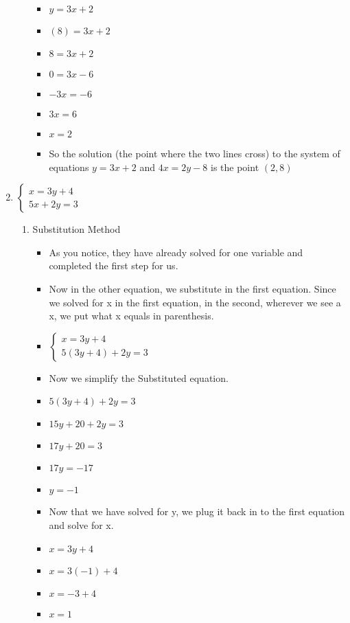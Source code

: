 \documentclass{article}
\begin{document}
\begin{enumerate}
\begin{enumerate}
\begin{itemize}
    \item []  $y=3x+2$
    \item []  $(8)=3x+2$
    \item []  $8=3x+2$
    \item []  $0=3x-6$
    \item []  $-3x=-6$
    \item []  $3x=6$
    \item []  $x=2$
    \item So the solution (the point where the two lines cross) to the system of equations $y=3x+2$ and $4x=2y-8$ is the point $(2,8)$
    \end{itemize}
  \end{enumerate}
\item $\left\{ \begin{array}{l}
      x=3y+4 \\
      5x+2y=3 \end{array} \right.$
  \begin{enumerate}
  \item Substitution Method
    \begin{itemize}
    \item As you notice, they have already solved for one variable and completed the first step for us.
    \item Now in the other equation, we substitute in the first equation. Since we solved for x in the first equation, in the second, wherever we see a x, we put what x equals in parenthesis.
    \item []  $\left\{ \begin{array}{l}
              x=3y+4 \\
              5(3y+4)+2y=3 \end{array} \right.$
    \item Now we simplify the Substituted equation.
    \item []  $5(3y+4)+2y=3$
    \item []  $15y+20+2y=3$
    \item []  $17y+20=3$
    \item []  $17y=-17$
    \item []  $y=-1$
    \item Now that we have solved for y, we plug it back in to the first equation and solve for x.
    \item []  $x=3y+4$
    \item []  $x=3(-1)+4$
    \item []  $x=-3+4$
    \item []  $x=1$

\end{itemize}
\end{enumerate}
\end{enumerate}
\end{document}
